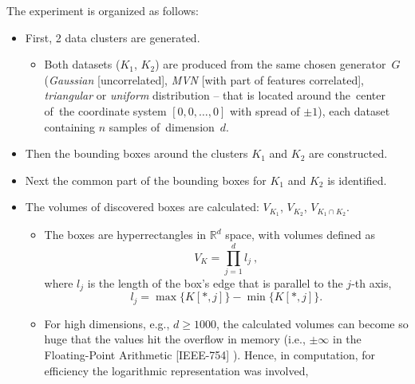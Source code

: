 The experiment is organized as follows:
\vspace{-0.5\baselineskip}
\begin{itemize}
    \item First, 2 data clusters are generated.
          \begin{itemize}
              \item Both datasets ($K_1$, $K_2$) are produced from the same chosen generator~$G$ (\textit{Gaussian} [uncorrelated], \textit{MVN} [with part of features correlated], \textit{triangular} or \textit{uniform} distribution – that is located around the~center of~the coordinate system $[0, 0, \dots, 0]$ with spread of $\pm 1$), each dataset containing $n$ samples of~dimension~$d$.
          \end{itemize}
    \item Then the bounding boxes around the clusters $K_1$ and $K_2$ are constructed.
    \item Next the common part of the bounding boxes for $K_1$ and $K_2$ is identified.
    \item The volumes of discovered boxes are calculated: $V_{K_1}$, $V_{K_2}$, $V_{K_1 \cap K_2}$.
          \begin{itemize}
              \item The boxes are hyperrectangles in $\mathbb{R}^d$ space, with volumes defined as
                    \begin{equation}
                        V_K = \prod_{j=1}^d l_j
                        ~,
                        \label{eq:hyperrectangle-volume}
                    \end{equation}
                    where $l_j$ is the length of the box's edge that is parallel to the $j$-th axis,
                    \begin{equation}
                        l_j
                        =
                        \max\big\{
                            K[*,j]
                        \big\}
                        -
                        \min\big\{
                            K[*,j]
                        \big\}
                        .
                        \label{eq:hyperrectangle-edge-length}
                    \end{equation}
              \item For high dimensions, e.g., $d \geq 1000$, the calculated volumes can become so huge that the values hit the overflow in memory (i.e., $\pm\infty$ in the Floating-Point Arithmetic [IEEE-754] \cite{IEEE-754-2019}\cite{Goldberg-1991}). Hence, in computation, for efficiency the logarithmic representation was involved,

\end{itemize}
\end{itemize}
